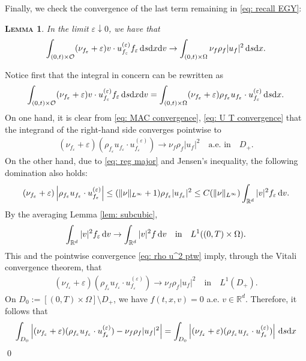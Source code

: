 \documentclass[10pt, reqno]{amsart}
\theoremstyle{plain}
\newtheorem{lemma}[theorem]{\normalfont \scshape Lemma}
\theoremstyle{definition}
\theoremstyle{remark}
\renewenvironment{proof}[1][\proofname]{\noindent{\scshape #1.\quad}}{\qed}
\numberwithin{equation}{section}
\newcommand{\calO}{\mathcal O}
\newcommand{\R}{\mathbb{R}}
\newcommand{\ve}{\varepsilon}
\newcommand{\dx}{\textnormal{d}x}
\newcommand{\dv}{\textnormal{d}v}
\newcommand{\ds}{\textnormal{d}s}
\newcommand{\lt}{\left}
\newcommand{\rt}{\right}
\newcommand{\intr}{\int_{\R^d}}
\begin{document}
Finally, we check the convergence of the last term remaining in \eqref{eq: recall EGY}:

\begin{lemma}
In the limit $\ve\downarrow 0$, we have that
\begin{align*}
    \int_{(0,t)\times \calO} (\nu_{f_\ve} + \ve) v\cdot u_{f_\ve}^{(\ve)}  f_\ve \,\ds\dx\dv \to \int_{(0,t)\times \Omega} \nu_f \rho_f |u_f|^2 \,\ds\dx.
\end{align*}
\end{lemma}
\begin{proof}
Notice first that the integral in concern can be rewritten as
\begin{align}\label{eq: mass last int}
    \int_{(0,t)\times \calO} (\nu_{f_\ve} + \ve) v\cdot u_{f_\ve}^{(\ve)}  f_\ve \,\ds\dx\dv = \int_{(0,t)\times \Omega} (\nu_{f_\ve} + \ve) \rho_{f_\ve} u_{f_\ve} \cdot u_{f_\ve}^{(\ve)} \,\ds\dx.
\end{align}
On one hand, it is clear from \eqref{eq: MAC convergence}, \eqref{eq: U T convergence} that the integrand of the right-hand side converges pointwise to
\begin{align}\label{eq: rho u^2 ptw}
    (\nu_{f_\ve} + \ve)(\rho_{f_\ve} u_{f_\ve} \cdot u_{f_\ve}^{(\ve)}) \to \nu_f \rho_f |u_f|^2 \quad \text{a.e. in} \quad D_+ .
\end{align}
On the other hand, due to \eqref{eq: reg major} and Jensen's inequality, the following domination also holds:
\begin{align*}
    (\nu_{f_\ve} + \ve) \lt|\rho_{f_{\ve}} u_{f_\ve} \cdot u_{f_\ve}^{(\ve)}\rt| \le (\|\nu\|_{L^\infty} + 1) \rho_{f_\ve} |u_{f_\ve}|^2 \le C(\|\nu\|_{L^\infty}) \int_{\R^d} |v|^2 f_\ve \,\dv.
\end{align*}
By the averaging Lemma \ref{lem: subcubic},
\begin{align}\label{eq: v^2}
    \int_{\R^d} |v|^2 f_\ve \,\dv \to \intr |v|^2 f \,\dv \quad \text{in}\quad L^1((0,T)\times\Omega).
\end{align}
This and the pointwise convergence \eqref{eq: rho u^2 ptw} imply, through the Vitali convergence theorem, that 
\begin{align*}
    (\nu_{f_\ve} + \ve)(\rho_{f_\ve} u_{f_\ve} \cdot u_{f_\ve}^{(\ve)}) \to \nu_f \rho_f |u_f|^2 \quad \text{in}\quad L^1(D_+).
\end{align*}
On $D_0 := [(0,T)\times \Omega]\setminus D_+$, we have $f(t,x,v)=0$ a.e. $v\in\R^d$. Therefore, it follows that
\begin{align*}
    \int_{D_0} \lt| (\nu_{f_\ve} + \ve)(\rho_{f_\ve} u_{f_\ve} \cdot u_{f_\ve}^{(\ve)}) - \nu_f \rho_f |u_f|^2\rt| &= \int_{D_0} \lt|(\nu_{f_\ve} + \ve) (\rho_{f_\ve} u_{f_\ve} \cdot u_{f_\ve}^{(\ve)}) \rt| \,\ds\dx \\

\end{align*}
\end{proof}
\end{document}
